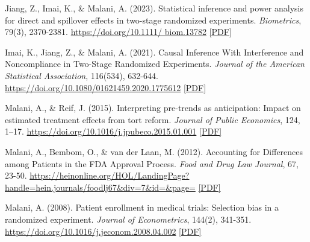     \begin{tablist}

        \item[2023] \tab{}Jiang, Z., Imai, K., \& Malani, A. (2023). Statistical inference and power analysis for direct and spillover effects in two-stage randomized experiments. \textit{Biometrics}, 79(3), 2370-2381. \href{https://doi.org/10.1111/biom.13782}{https://doi.org/10.1111/ biom.13782} \href{https://github.com/anup-malani/website_personal/blob/main/publications/2022_JiangImaiMalani_Biometrics_TwoStageExperiments.pdf}{[PDF]}
        
        \item[2021] \tab{}Imai, K., Jiang, Z., \& Malani, A. (2021). Causal Inference With Interference and Noncompliance in Two-Stage Randomized Experiments. \textit{Journal of the American Statistical Association}, 116(534), 632-644. \href{https://doi.org/10.1080/01621459.2020.1775612}{https://doi.org/10.1080/01621459.2020.1775612} \href{https://github.com/anup-malani/website_personal/blob/main/publications/2021_ImaiMalaniJiang_JASA_TwoStageExperiments.pdf}{[PDF]}

        \item[2015] \tab{}Malani, A., \& Reif, J. (2015). Interpreting pre-trends as anticipation: Impact on estimated treatment effects from tort reform. \textit{Journal of Public Economics}, 124, 1–17. \href{https://doi.org/10.1016/j.jpubeco.2015.01.001}{https://doi.org/10.1016/j.jpubeco.2015.01.001} \href{https://github.com/anup-malani/website_personal/blob/main/publications/2015_MalaniReif_JPubEc_Anticipation.pdf}{[PDF]}
        
        \item[2012] \tab{}Malani, A., Bembom, O., \& van der Laan, M. (2012). Accounting for Differences among Patients in the FDA Approval Process. \textit{Food and Drug Law Journal}, 67, 23-50. \href{https://heinonline.org/HOL/LandingPage?handle=hein.journals/foodlj67&div=7&id=&page=}{https://heinonline.org/HOL/LandingPage?handle=hein.journals/foodlj67\&div=7\&id=\&page=} \href{https://github.com/anup-malani/website_personal/blob/main/publications/2012_Malani_FDAHetergeneousTreatmentEffects.pdf}{[PDF]}
        
        \item[2008] \tab{}Malani, A. (2008). Patient enrollment in medical trials: Selection bias in a randomized experiment. \textit{Journal of Econometrics}, 144(2), 341-351. \href{https://doi.org/10.1016/j.jeconom.2008.04.002}{https://doi.org/10.1016/j.jeconom.2008.04.002}  \href{https://github.com/anup-malani/website_personal/blob/main/publications/2008_Malani_JMetrics_PatientEnrollment.pdf}{[PDF]} 
        

\end{tablist}
